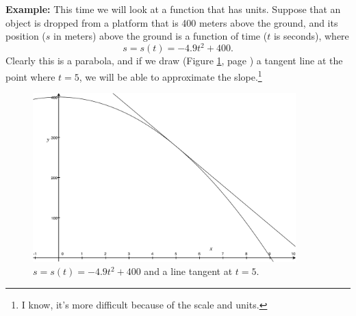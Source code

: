 \documentclass[12pt,addpoints, answers, fleqn]{exam}
\begin{document}
\textbf{Example:} This time we will look at a function that has units. Suppose that an object is dropped from a platform that is 400 meters above the ground, and its position ($s$ in meters) above the ground is a function of time ($t$ is seconds), where
\[
s = s \left( t \right) = -4.9 t^2 + 400.
\]
Clearly this is a parabola, and if we draw (Figure \ref{fig:graph020102}, page \pageref{fig:graph020102}) a tangent line at the point where $t=5$, we will be able to approximate the slope.\footnote{I know, it's more difficult because of the scale and units.}
\begin{figure}[htbp] %
   \centering
   \includegraphics[width=4in]{graphics/graph020102.pdf} 
   \caption{$s = s \left( t \right) = -4.9 t^2 + 400$ and a line tangent at $t=5$.}
   \label{fig:graph020102}
\end{figure}
\end{document}
